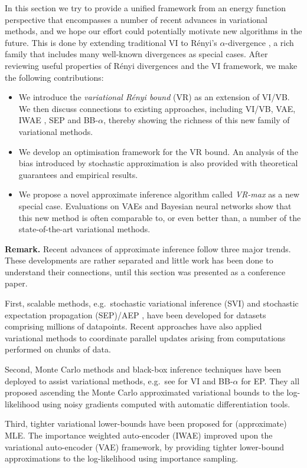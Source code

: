 
In this section we try to provide a unified framework from an energy function perspective that encompasses a number of recent advances in variational methods, and we hope our effort could potentially motivate new algorithms in the future. This is done by extending traditional VI to R{\'e}nyi's $\alpha$-divergence \cite{renyi:divergence1961}, a rich family that includes many well-known divergences as special cases. After reviewing useful properties of R{\'e}nyi divergences and the VI framework, we make the following contributions:

\begin{itemize}
 \item We introduce the \emph{variational R{\'e}nyi bound} (VR) as an extension of VI/VB. We then discuss connections to existing approaches, including VI/VB, VAE, IWAE \cite{burda:iwae2016}, SEP and BB-$\alpha$, thereby showing the richness of this new family of variational methods.
 \item We develop an optimisation framework for the VR bound. An analysis of the bias introduced by stochastic approximation is also provided with theoretical guarantees and empirical results.
 \item We propose a novel approximate inference algorithm called \emph{VR-max} as a new special case. Evaluations on VAEs and Bayesian neural networks show that this new method is often comparable to, or even better than, a number of the state-of-the-art variational methods.
\end{itemize}


\textbf{Remark.} Recent advances of approximate inference follow three major trends. These developments are rather separated and little work has been done to understand their connections, until this section was presented as a conference paper.

First, scalable methods, e.g.~stochastic variational inference (SVI) \cite{hoffman:svi2013} and stochastic expectation propagation (SEP)/AEP \cite{barthelme:aep2015}, have been developed for datasets comprising millions of datapoints. Recent approaches \cite{broderick:stream2013, gelman:dep2014, xu:sms2014} have also applied variational methods to coordinate parallel updates arising from computations performed on chunks of data.

Second, Monte Carlo methods and black-box inference techniques have been deployed to assist variational methods, e.g.~see \cite{paisley:bbvi2012, salimans:reparam2013, ranganath:bbvi2014, kucukelbir:advi2015} for VI and BB-$\alpha$ for EP. They all proposed ascending the Monte Carlo approximated variational bounds to the log-likelihood using noisy gradients computed with automatic differentiation tools.

Third, tighter variational lower-bounds have been proposed for (approximate) MLE. The importance weighted auto-encoder (IWAE) \cite{burda:iwae2016} improved upon the variational auto-encoder (VAE) \cite{kingma:vae2014, rezende:vae2014} framework, by providing tighter lower-bound approximations to the log-likelihood using importance sampling. 